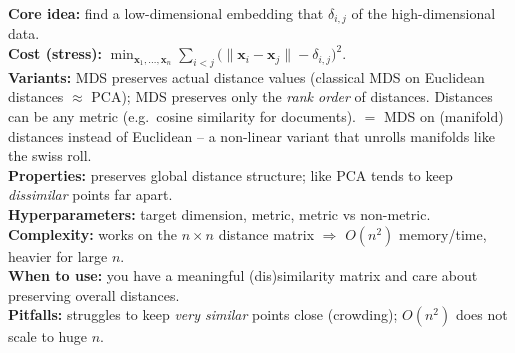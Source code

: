 \begin{algobox}
\textbf{Core idea:} find a low-dimensional embedding that  $\delta_{i,j}$ of the high-dimensional data.\\
\textbf{Cost (stress):}
$\displaystyle \min_{\mathbf{x}_1,\dots,\mathbf{x}_n}\sum_{i<j}\bigl(\lVert
\mathbf{x}_i-\mathbf{x}_j\rVert-\delta_{i,j}\bigr)^2$.\\
\textbf{Variants:}  MDS preserves actual distance values
(classical MDS on Euclidean distances $\approx$ PCA);  MDS
preserves only the \emph{rank order} of distances. Distances can be any metric
(e.g.\ cosine similarity for documents).  $=$ MDS on 
(manifold) distances instead of Euclidean -- a non-linear variant that unrolls
manifolds like the swiss roll.\\
\textbf{Properties:} preserves global distance structure; like PCA tends to keep
\emph{dissimilar} points far apart.\\
\textbf{Hyperparameters:} target dimension, metric, metric vs non-metric.\\
\textbf{Complexity:} works on the $n\times n$ distance matrix $\Rightarrow$
$O(n^2)$ memory/time, heavier for large $n$.\\
\textbf{When to use:} you have a meaningful (dis)similarity matrix and care about
preserving overall distances.\\
\textbf{Pitfalls:} struggles to keep \emph{very similar} points close (crowding);
$O(n^2)$ does not scale to huge $n$.
\end{algobox}


